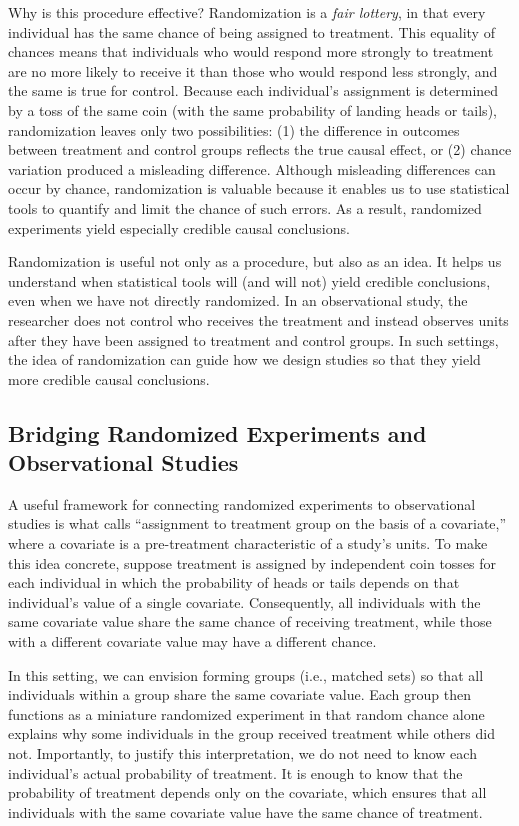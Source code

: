 \documentclass[
  12pt,
  leqno]{article}
\begin{document}
Why is this procedure effective? Randomization is a \emph{fair lottery},
in that every individual has the same chance of being assigned to
treatment. This equality of chances means that individuals who would
respond more strongly to treatment are no more likely to receive it than
those who would respond less strongly, and the same is true for control.
Because each individual's assignment is determined by a toss of the same
coin (with the same probability of landing heads or tails),
randomization leaves only two possibilities: (1) the difference in
outcomes between treatment and control groups reflects the true causal
effect, or (2) chance variation produced a misleading difference.
Although misleading differences can occur by chance, randomization is
valuable because it enables us to use statistical tools to quantify and
limit the chance of such errors. As a result, randomized experiments
yield especially credible causal conclusions.

Randomization is useful not only as a procedure, but also as an idea. It
helps us understand when statistical tools will (and will not) yield
credible conclusions, even when we have not directly randomized. In an
observational study, the researcher does not control who receives the
treatment and instead observes units after they have been assigned to
treatment and control groups. In such settings, the idea of
randomization can guide how we design studies so that they yield more
credible causal conclusions.

\subsection{Bridging Randomized Experiments and Observational
Studies}\label{bridging-randomized-experiments-and-observational-studies}

A useful framework for connecting randomized experiments to
observational studies is what \citet{rubin1977} calls ``assignment to
treatment group on the basis of a covariate,'' where a covariate is a
pre-treatment characteristic of a study's units. To make this idea
concrete, suppose treatment is assigned by independent coin tosses for
each individual in which the probability of heads or tails depends on
that individual's value of a single covariate. Consequently, all
individuals with the same covariate value share the same chance of
receiving treatment, while those with a different covariate value may
have a different chance.

In this setting, we can envision forming groups (i.e., matched sets) so
that all individuals within a group share the same covariate value. Each
group then functions as a miniature randomized experiment in that random
chance alone explains why some individuals in the group received
treatment while others did not. Importantly, to justify this
interpretation, we do not need to know each individual's actual
probability of treatment. It is enough to know that the probability of
treatment depends only on the covariate, which ensures that all
individuals with the same covariate value have the same chance of
treatment.
\end{document}
